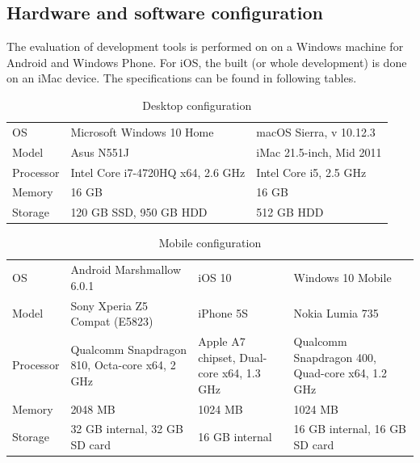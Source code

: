 \documentclass[english,master,public,dept460,male,cpdeclaration,oneside]{diploma}
\begin{document}
\subsection{Hardware and software configuration}
The evaluation of development tools is performed on on a Windows machine for Android and Windows Phone. For iOS, the built (or whole development) is done on an iMac device. The specifications can be found in following tables.

\begin{table}[!h]
	\centering
	\caption{Desktop configuration}
	\begin{tabular}{p{2cm} | p{4.5cm} p{4.5cm}}
		\toprule
		OS & Microsoft Windows 10 Home & macOS Sierra, v 10.12.3 \\
		Model & Asus N551J & iMac 21.5-inch, Mid 2011 \\
		Processor & Intel Core i7-4720HQ x64, 2.6 GHz & Intel Core i5, 2.5 GHz \\
		Memory & 16 GB & 16 GB \\
		Storage & 120 GB SSD, 950 GB HDD & 512 GB HDD \\
		\midrule
	\end{tabular}
\end{table}

\begin{table}[!h]
	\centering
	\caption{Mobile configuration}
	\begin{tabular}{p{2cm} | p{3.5cm} p{3.5cm} p{3.5cm}}
		\toprule
		OS & Android Marshmallow 6.0.1 & iOS 10 & Windows 10 Mobile \\
		Model & Sony Xperia Z5 Compat (E5823) & iPhone 5S & Nokia Lumia 735 \\
		Processor & Qualcomm Snapdragon 810, Octa-core x64, 2 GHz & Apple A7 chipset, Dual-core x64, 1.3 GHz & Qualcomm Snapdragon 400, Quad-core x64, 1.2 GHz \\
		Memory & 2048 MB & 1024 MB & 1024 MB \\
		Storage & 32 GB internal, 32 GB SD card & 16 GB internal & 16 GB internal, 16 GB SD card \\
		\midrule
	\end{tabular}
\end{table}
\end{document}
